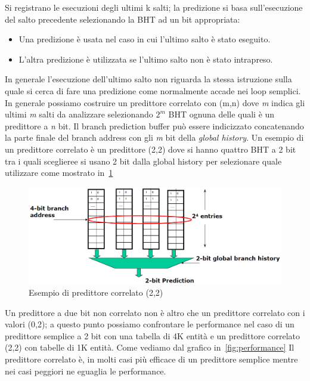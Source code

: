 Si registrano le esecuzioni degli ultimi k salti; la predizione si basa sull'esecuzione del salto precedente selezionando la BHT ad un bit appropriata:
\begin{itemize}
\item Una predizione è usata nel caso in cui l'ultimo salto è stato eseguito.
\item L'altra predizione è utilizzata se l'ultimo salto non è stato intrapreso.
\end{itemize}
In generale l'esecuzione dell'ultimo salto non riguarda la stessa istruzione sulla quale si cerca di fare una predizione come normalmente accade nei loop semplici.\\
In generale possiamo costruire un predittore correlato con (m,n) dove \emph{m} indica gli ultimi \emph{m} salti da analizzare selezionando $2^m$ BHT ognuna delle quali è un predittore a \emph{n} bit.
Il branch prediction buffer può essere indicizzato concatenando la parte finale del branch address con gli \emph{m} bit della \emph{global history}.
Un esempio di un predittore correlato è un predittore (2,2) dove si hanno quattro BHT a 2 bit tra i quali sceglieree si usano 2 bit dalla global history per selezionare quale utilizzare come mostrato in \figurename\,\ref{fig:22correlato}
\begin{figure}[bht]
\centering
\includegraphics[scale=0.5]{img/22correlato.png}
\caption{Esempio di predittore correlato (2,2)}\label{fig:22correlato}
\end{figure}
Un predittore a due bit non correlato non è altro che un predittore correlato con i valori (0,2); a questo punto possiamo confrontare le performance nel caso di un predittore semplice a 2 bit con una tabella di 4K entità e un predittore correlato (2,2) con tabelle di 1K entità. Come vediamo dal grafico in \figurename\,\ref{fig:performance}
Il predittore correlato è, in molti casi più efficace di un predittore semplice mentre nei casi peggiori ne eguaglia le performance.

